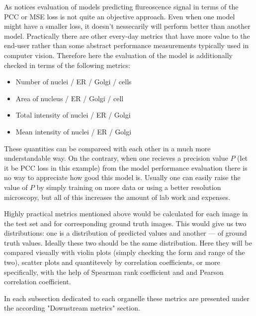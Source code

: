 
As \cite{Lachance_2020} notices evaluation of models predicting flureoscence signal in terms of the PCC or MSE loss is not quite an objective approach. Even when one model might have a smaller loss, it doesn't nessecarily will perform better than another model. Practically there are other every-day metrics that have more value to the end-user rather than some abstract performance measurements typically used in computer vision. Therefore here the evaluation of the model is additionally checked in terms of the following metrics:
\begin{itemize}
    \item Number of nuclei / ER / Golgi / cells
    \item Area of nucleus / ER / Golgi / cell
    \item Total intensity of nuclei / ER / Golgi
    \item Mean intensity of nuclei / ER / Golgi
\end{itemize}

These quantities can be compareed with each other in a much more understandable way. On the contrary, when one recieves a precision value $P$ (let it be PCC loss in this example) from the model performance evaluation there is no way to appreciate how good this model is. Usually one can easily raise the value of $P$ by simply training on more data or using a better resolution microscopy, but all of this increases the amount of lab work and expenses.

Highly practical metrics mentioned above would be calculated for each image in the test set and for corresponding ground truth images. This would give us two distributions: one is a distribution of predicted values and another --- of ground truth values. Ideally these two should be the same distribution. Here they will be compared visually with violin plots (simply checking the form and range of the two), scatter plots and quantitevely by correlation coefficients, or more specifically, with the help of Spearman rank coefficient and and Pearson correlation coefficient.

In each subsection dedicated to each organelle these metrics are presented under the according "Downstream metrics" section.